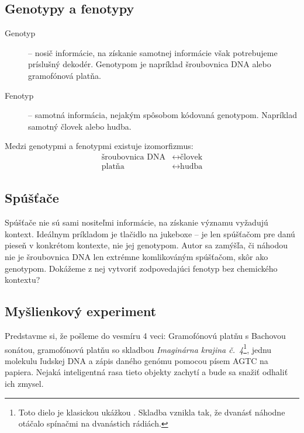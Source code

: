 \documentclass[12pt]{article}
\begin{document}
\subsection{Genotypy a fenotypy}

\begin{description}
\item[Genotyp] -- nosič informácie, na získanie samotnej informácie však potrebujeme príslušný dekodér. Genotypom je napríklad šroubovnica DNA alebo gramofónová platňa.
\item[Fenotyp] -- samotná informácia, nejakým spôsobom kódovaná genotypom. Napríklad samotný človek alebo hudba.
\end{description}

\noindent
Medzi genotypmi a fenotypmi existuje izomorfizmus:
\begin{align*}
\text{šroubovnica DNA} &\leftrightarrow \text{človek}\\
\text{platňa} &\leftrightarrow \text{hudba}
\end{align*}

\subsection{Spúšťače}

Spúšťače nie sú sami nositeľmi informácie, na získanie významu vyžadujú kontext. Ideálnym príkladom je tlačidlo na jukeboxe -- je len spúšťačom pre danú pieseň v konkrétom kontexte, nie jej genotypom. Autor sa zamýšľa, či náhodou nie je šroubovnica DNA len extrémne komlikováným spúšťačom, skôr ako genotypom. Dokážeme z nej vytvoriť zodpovedajúci fenotyp bez  chemického kontextu?

\subsection{Myšlienkový experiment}

Predstavme si, že pošleme do vesmíru 4 veci: Gramofónovú platňu s Bachovou sonátou, gramofónovú platňu so skladbou \textit{Imaginárna krajina č.\ 4}\footnote{Toto dielo je klasickou ukážkou . Skladba vznikla tak, že dvanásť  náhodne otáčalo spínačmi na dvanástich rádiách.}, jednu molekulu ľudskej DNA a zápis daného genómu pomocou písem AGTC na  papiera. Nejaká inteligentná rasa tieto objekty zachytí a bude sa snažiť odhaliť ich zmysel.
\end{document}
